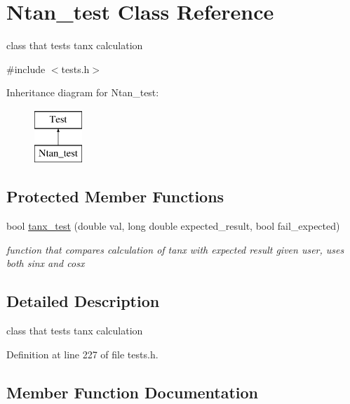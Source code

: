 \hypertarget{class_ntan__test}{}\section{Ntan\+\_\+test Class Reference}
\label{class_ntan__test}


class that tests tanx calculation  




{\ttfamily \#include $<$tests.\+h$>$}

Inheritance diagram for Ntan\+\_\+test\+:\begin{figure}[H]
\begin{center}
\leavevmode
\includegraphics[height=2.000000cm]{class_ntan__test}
\end{center}
\end{figure}
\subsection*{Protected Member Functions}
\begin{DoxyCompactItemize}
\item 
bool \mbox{\hyperlink{class_ntan__test_ad7ab02fd407b449bdfbf269275b97d43}{tanx\+\_\+test}} (double val, long double expected\+\_\+result, bool fail\+\_\+expected)
\begin{DoxyCompactList}\small\item\em function that compares calculation of tanx with expected result given user, uses both sinx and cosx \end{DoxyCompactList}\end{DoxyCompactItemize}


\subsection{Detailed Description}
class that tests tanx calculation 

Definition at line 227 of file tests.\+h.



\subsection{Member Function Documentation}
\mbox{\label{class_ntan__test_ad7ab02fd407b449bdfbf269275b97d43}} 
